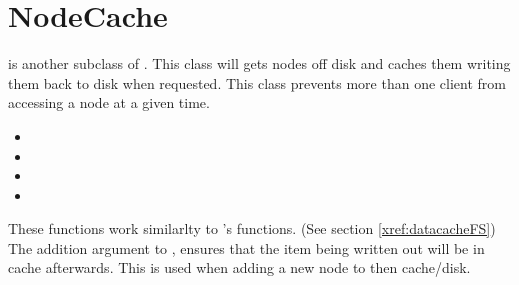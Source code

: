 \section{NodeCache}
\label{xref:nodecacheFS}
   is another subclass of .  
  This class will gets nodes off disk and caches them writing them
  back to disk when requested. This class prevents more than one client
  from accessing a node at a given time.

  \begin{itemize}
      \item	{}
      \item     {}
      \item	{}
      \item	{} 
  \end{itemize}

  These functions work similarlty to 's functions.  (See
  section \ref{xref:datacacheFS})  The addition argument to ,
   ensures that the item
  being written out will be in cache afterwards. This is used when adding a new node
  to then cache/disk.

